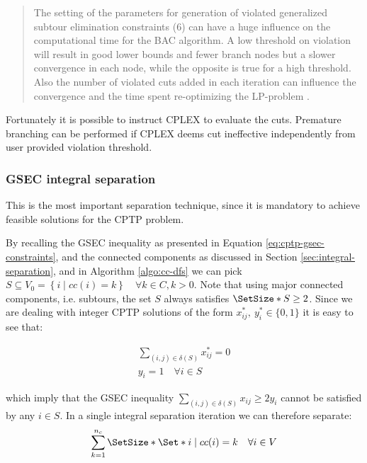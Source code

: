\begin{quote}
	The setting of the parameters for generation of violated generalized subtour elimination constraints
	(6) can have a huge influence on the computational time for the BAC algorithm. A low threshold on
	violation will result in good lower bounds and fewer branch nodes but a slower convergence in each
	node, while the opposite is true for a high threshold. Also the number of violated cuts added in each
	iteration can influence the convergence and the time spent re-optimizing the LP-problem \cite{jepsen2008branchandcut}.
\end{quote}

Fortunately it is possible to instruct CPLEX to evaluate the cuts.
Premature branching can be performed if CPLEX deems cut ineffective independently
from user provided violation threshold.

\subsubsection{GSEC integral separation}
\label{sec:impl-gsec-integral-separation}

This is the most important separation technique, since it is mandatory to achieve feasible solutions for the CPTP problem.

By recalling the GSEC inequality as presented in Equation \eqref{eq:cptp-gsec-constraints}, and the connected components as discussed in Section \ref{sec:integral-separation}, and in Algorithm \ref{algo:cc-dfs} we can pick $S \subseteq V_0 = \left\{ i \mid cc(i) = k  \right\}   \quad \forall k \in C, k > 0$.
Note that using major connected components, i.e. subtours, the set $S$ always satisfies $\SetSize*{S} \ge 2$.
Since we are dealing with integer CPTP solutions of the form $x^*_{ij},\ y^*_{i} \in \{0, 1\}$ it is easy to see that:

\begin{align}
	\sum_{(i, j) \in \delta(S)} x^*_{ij} = 0 \\
	y_i =  1 \quad \forall i \in S
\end{align}

which imply that the GSEC inequality $\sum_{(i, j) \in \delta(S)} x_{ij} \ge 2 y_i$ cannot be satisfied by any $i \in S$.
In a single integral separation iteration we can therefore separate:
\begin{equation}
	\sum^{n_c}_{k = 1} \SetSize*{ \Set*{ i \mid cc(i) = k \quad \forall i \in V } }
\end{equation}

